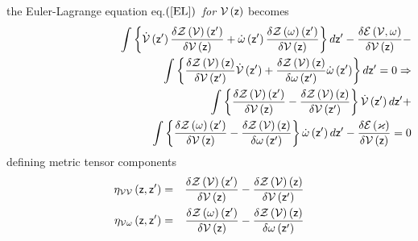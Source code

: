 the Euler-Lagrange equation eq.$\left( \ref{EL}\right) ${\em \ for} ${\cal V}%
\left( {\sf z}\right) $ becomes 
\begin{eqnarray}
&&\int \left\{ {\cal \dot{V}}\left( {\sf z}^{\prime }\right) \frac{\delta 
{\cal Z}\left( {\cal V}\right) \left( {\sf z}^{\prime }\right) }{\delta 
{\cal V}\left( {\sf z}\right) }+{\cal \dot{\omega}}\left( {\sf z}^{\prime
}\right) \frac{\delta {\cal Z}\left( {\cal \omega }\right) \left( {\sf z}%
^{\prime }\right) }{\delta {\cal V}\left( {\sf z}\right) }\right\} d{\sf z}%
^{\prime }-\frac{\delta {\cal E}\left( {\cal V},\omega \right) }{\delta 
{\cal V}\left( {\sf z}\right) }-  \nonumber \\
&&\qquad \qquad \qquad \qquad \qquad \qquad \int \left\{ \frac{\delta {\cal Z%
}\left( {\cal V}\right) \left( {\sf z}\right) }{\delta {\cal V}\left( {\sf z}%
^{\prime }\right) }{\cal \dot{V}}\left( {\sf z}^{\prime }\right) +\frac{%
\delta {\cal Z}\left( {\cal V}\right) \left( {\sf z}\right) }{\delta {\cal %
\omega }\left( {\sf z}^{\prime }\right) }{\cal \dot{\omega}}\left( {\sf z}%
^{\prime }\right) \right\} d{\sf z}^{\prime }=0\Rightarrow  \nonumber \\
&\quad &\int \left\{ \frac{\delta {\cal Z}\left( {\cal V}\right) \left( {\sf %
z}^{\prime }\right) }{\delta {\cal V}\left( {\sf z}\right) }-\frac{\delta 
{\cal Z}\left( {\cal V}\right) \left( {\sf z}\right) }{\delta {\cal V}\left( 
{\sf z}^{\prime }\right) }\right\} {\cal \dot{V}}\left( {\sf z}^{\prime
}\right) d{\sf z}^{\prime }+  \nonumber \\
&&\qquad \qquad \qquad \quad \qquad \quad \int \left\{ \frac{\delta {\cal Z}%
\left( {\cal \omega }\right) \left( {\sf z}^{\prime }\right) }{\delta {\cal V%
}\left( {\sf z}\right) }-\frac{\delta {\cal Z}\left( {\cal V}\right) \left( 
{\sf z}\right) }{\delta {\cal \omega }\left( {\sf z}^{\prime }\right) }%
\right\} {\cal \dot{\omega}}\left( {\sf z}^{\prime }\right) d{\sf z}^{\prime
}-\frac{\delta {\cal E}\left( {\cal \varkappa }\right) }{\delta {\cal V}%
\left( {\sf z}\right) }=0
\end{eqnarray}%
defining metric tensor components 
\begin{eqnarray}
\eta _{{\cal VV}}\left( {\sf z,z}^{\prime }\right) &=&\frac{\delta {\cal Z}%
\left( {\cal V}\right) \left( {\sf z}^{\prime }\right) }{\delta {\cal V}%
\left( {\sf z}\right) }-\frac{\delta {\cal Z}\left( {\cal V}\right) \left( 
{\sf z}\right) }{\delta {\cal V}\left( {\sf z}^{\prime }\right) }  \nonumber
\\
\eta _{{\cal V\omega }}\left( {\sf z,z}^{\prime }\right) &=&\frac{\delta 
{\cal Z}\left( {\cal \omega }\right) \left( {\sf z}^{\prime }\right) }{%
\delta {\cal V}\left( {\sf z}\right) }-\frac{\delta {\cal Z}\left( {\cal V}%
\right) \left( {\sf z}\right) }{\delta {\cal \omega }\left( {\sf z}^{\prime
}\right) }  \label{mt}
\end{eqnarray}%
